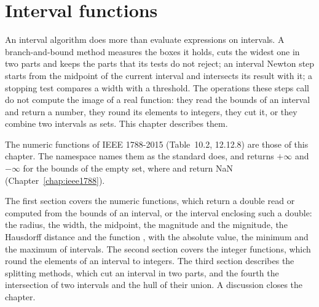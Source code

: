 \chapter{Interval functions}\label{chap:functions}

An interval algorithm does more than evaluate expressions on intervals. A
branch-and-bound method measures the boxes it holds, cuts the widest one in
two parts and keeps the parts that its tests do not reject; an interval
Newton step starts from the midpoint of the current interval and intersects
its result with it; a stopping test compares a width with a threshold. The
operations these steps call do not compute the image of a real function:
they read the bounds of an interval and return a number, they round its
elements to integers, they cut it, or they combine two intervals as sets.
This chapter describes them.

\medskip
The numeric functions of IEEE 1788-2015 (Table~10.2, 12.12.8) are those of
this chapter. The namespace  names them as the standard
does, and returns $+\infty$ and $-\infty$ for the bounds of the empty set,
where  and  return NaN
(Chapter~\ref{chap:ieee1788}).

\medskip
The first section covers the numeric functions, which return a double read
or computed from the bounds of an interval, or the interval enclosing such a
double: the radius, the width, the midpoint, the magnitude and the
mignitude, the Hausdorff distance and the function , with the
absolute value, the minimum and the maximum of intervals. The second section
covers the integer functions, which round the elements of an interval to
integers. The third section describes the splitting methods, which cut an
interval in two parts, and the fourth the intersection of two intervals and
the hull of their union. A discussion closes the chapter.

